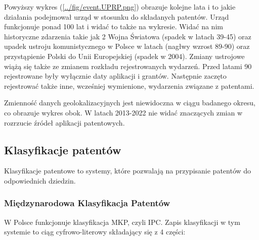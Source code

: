 Powyższy wykres (\ref{../fig/event.UPRP.png}) obrazuje kolejne lata i to jakie
działania podejmował urząd w stosunku do składanych patentów. Urząd funkcjonuje
ponad 100 lat i widać to także na wykresie.
Widać na nim historyczne zdarzenia takie jak 2 Wojna Światowa (spadek w latach 39-45) 
oraz upadek ustroju komunistycznego w Polsce w latach (nagłwy wzrost 89-90) oraz
przystąpienie Polski do Unii Europejskiej (spadek w 2004).
Zmiany ustrojowe wiążą się także ze zmianem rozkładu rejestrowanych wydarzeń.
Przed latami 90 rejestrowane były wyłącznie daty aplikacji i grantów.
Następnie zaczęto rejestrować także inne, wcześniej wymienione, 
wydarzenia związane z patentami.

\newpage
\begin{multicols}{2}

Zmienność danych geolokalizacyjnych jest niewidoczna w ciągu badanego okresu, co obrazuje
wykres obok. W latach 2013-2022 nie widać znaczących zmian w rozrzucie źródeł
aplikacji patentowych.

\columnbreak
{}

\end{multicols}



\newpage
\subsection{Klasyfikacje patentów}

Klasyfikacje patentowe to systemy, które pozwalają na przypisanie
patentów do odpowiednich dziedzin.

\subsubsection{Międzynarodowa Klasyfikacja Patentów}

W Polsce funkcjonuje klasyfikacja
\ac{MKP}, czyli \ac{IPC}. Zapis klasyfikacji w tym systemie to ciąg
cyfrowo-literowy składający się z 4 części:

